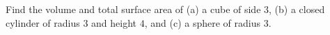 Find the volume and total surface area of (a) a cube of side $3$, (b) a closed cylinder of radius $3$ and height $4$, and (c) a sphere of radius $3$.
